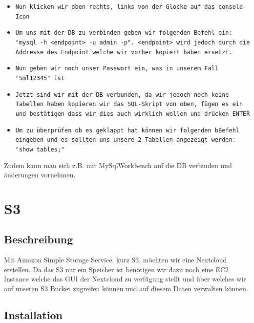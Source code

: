 \documentclass{article}
\begin{document}
\begin{itemize}
\item \texttt{Nun klicken wir oben rechts, links von der Glocke auf das console-Icon} \\

\item \texttt{Um uns mit der DB zu verbinden geben wir folgenden Befehl ein: "mysql -h <endpoint> -u admin -p". <endpoint> wird jedoch durch die Addresse des Endpoint welche wir vorher kopiert haben ersetzt.} \\

\item \texttt{Nun geben wir noch unser Passwort ein, was in unserem Fall "Sml12345" ist} \\

\item \texttt{Jetzt sind wir mit der DB verbunden, da wir jedoch noch keine Tabellen haben kopieren wir das SQL-Skript von oben, fügen es ein und bestätigen dass wir dies auch wirklich wollen und drücken ENTER} \\

\item \texttt{Um zu überprüfen ob es geklappt hat können wir folgenden bBefehl eingeben und es sollten uns unsere 2 Tabellen angezeigt werden: "show tables;"} \\

\end{itemize}

\noindent Zudem kann man sich z.B. mit MySqlWorkbench auf die DB verbinden und änderungen vornehmen.

\clearpage

\section{S3}

\subsection{Beschreibung}
Mit Amazon Simple Storage Service, kurz S3, möchten wir eine Nextcloud erstellen. Da das S3 nur ein Speicher ist benötigen wir dazu noch eine EC2 Instance welche das GUI der Nextcloud zu verfügung stellt und über welches wir auf unseren S3 Bucket zugreifen können und auf diesem Daten verwalten können.

\subsection{Installation}
\end{document}
